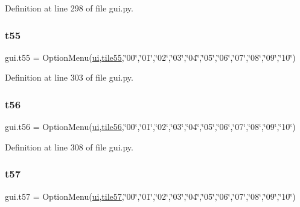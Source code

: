 Definition at line 298 of file gui.\+py.

\mbox{\label{namespacegui_ac06a8c29ba1eb2c7a445dd7df65ea3b9}} 
\subsubsection{\texorpdfstring{t55}{t55}}
{\footnotesize\ttfamily gui.\+t55 = Option\+Menu(\mbox{\hyperlink{namespacegui_a40ab7281456eadbea2dc2038f5c24fa1}{ui}},\mbox{\hyperlink{namespacegui_ab5439a2d27d228c10b945525d2cd4ba1}{tile55}},\char`\"{}00\char`\"{},\char`\"{}01\char`\"{},\char`\"{}02\char`\"{},\char`\"{}03\char`\"{},\char`\"{}04\char`\"{},\char`\"{}05\char`\"{},\char`\"{}06\char`\"{},\char`\"{}07\char`\"{},\char`\"{}08\char`\"{},\char`\"{}09\char`\"{},\char`\"{}10\char`\"{})}



Definition at line 303 of file gui.\+py.

\mbox{\label{namespacegui_ad1e784325f13abbece17d08027ec7448}} 
\subsubsection{\texorpdfstring{t56}{t56}}
{\footnotesize\ttfamily gui.\+t56 = Option\+Menu(\mbox{\hyperlink{namespacegui_a40ab7281456eadbea2dc2038f5c24fa1}{ui}},\mbox{\hyperlink{namespacegui_ae2646c4dbcba62132b11bc430f3c5b45}{tile56}},\char`\"{}00\char`\"{},\char`\"{}01\char`\"{},\char`\"{}02\char`\"{},\char`\"{}03\char`\"{},\char`\"{}04\char`\"{},\char`\"{}05\char`\"{},\char`\"{}06\char`\"{},\char`\"{}07\char`\"{},\char`\"{}08\char`\"{},\char`\"{}09\char`\"{},\char`\"{}10\char`\"{})}



Definition at line 308 of file gui.\+py.

\mbox{\label{namespacegui_a656fba4855925e2514610bd13473ac1d}} 
\subsubsection{\texorpdfstring{t57}{t57}}
{\footnotesize\ttfamily gui.\+t57 = Option\+Menu(\mbox{\hyperlink{namespacegui_a40ab7281456eadbea2dc2038f5c24fa1}{ui}},\mbox{\hyperlink{namespacegui_aa3077c3a423a682ff87cf7a59a096a1a}{tile57}},\char`\"{}00\char`\"{},\char`\"{}01\char`\"{},\char`\"{}02\char`\"{},\char`\"{}03\char`\"{},\char`\"{}04\char`\"{},\char`\"{}05\char`\"{},\char`\"{}06\char`\"{},\char`\"{}07\char`\"{},\char`\"{}08\char`\"{},\char`\"{}09\char`\"{},\char`\"{}10\char`\"{})}



